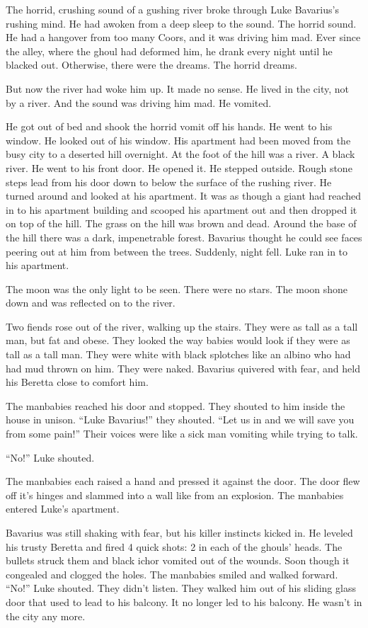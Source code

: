 The horrid, crushing sound of a gushing river broke through Luke
Bavarius's rushing mind. He had awoken from a deep sleep to the
sound. The horrid sound. He had a hangover from too many Coors, and
it was driving him mad. Ever since the alley, where the ghoul had
deformed him, he drank every night until he blacked out. Otherwise,
there were the dreams. The horrid dreams.

But now the river had woke him up. It made no sense. He lived in
the city, not by a river. And the sound was driving him mad. He
vomited.

He got out of bed and shook the horrid vomit off his hands. He went
to his window. He looked out of his window. His apartment had been
moved from the busy city to a deserted hill overnight. At the foot
of the hill was a river. A black river. He went to his front door.
He opened it. He stepped outside. Rough stone steps lead from his
door down to below the surface of the rushing river. He turned
around and looked at his apartment. It was as though a giant had
reached in to his apartment building and scooped his apartment out
and then dropped it on top of the hill. The grass on the hill was
brown and dead. Around the base of the hill there was a dark,
impenetrable forest. Bavarius thought he could see faces peering
out at him from between the trees. Suddenly, night fell. Luke ran
in to his apartment.

The moon was the only light to be seen. There were no stars. The
moon shone down and was reflected on to the river.

Two fiends rose out of the river, walking up the stairs. They were
as tall as a tall man, but fat and obese. They looked the way
babies would look if they were as tall as a tall man. They were
white with black splotches like an albino who had had mud thrown on
him. They were naked. Bavarius quivered with fear, and held his
Beretta close to comfort him.

The manbabies reached his door and stopped. They shouted to him
inside the house in unison. ``Luke Bavarius!'' they shouted. ``Let us
in and we will save you from some pain!'' Their voices were like a
sick man vomiting while trying to talk.

``No!'' Luke shouted.

The manbabies each raised a hand and pressed it against the door.
The door flew off it's hinges and slammed into a wall like from an
explosion. The manbabies entered Luke's apartment.

Bavarius was still shaking with fear, but his killer instincts
kicked in. He leveled his trusty Beretta and fired 4 quick shots: 2
in each of the ghouls' heads. The bullets struck them and black
ichor vomited out of the wounds. Soon though it congealed and
clogged the holes. The manbabies smiled and walked forward. ``No!''
Luke shouted. They didn't listen. They walked him out of his
sliding glass door that used to lead to his balcony. It no longer
led to his balcony. He wasn't in the city any more.

